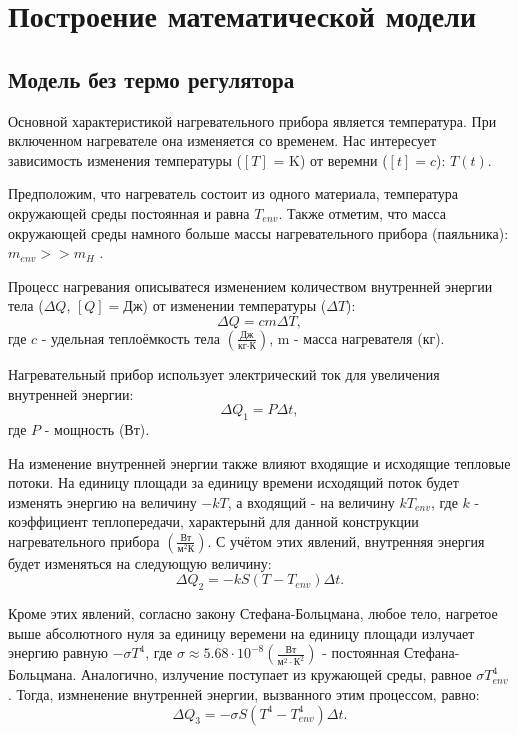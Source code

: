 \chapter{Построение математической модели}
\section{Модель без термо регулятора}
Основной характеристикой нагревательного прибора является температура. При включенном нагревателе она изменяется со временем. Нас интересует зависимость изменения температуры ($[T]$ = K) от веремни ($[t]=c$): $T(t)$.

Предположим, что нагреватель состоит из одного материала, температура окружающей среды постоянная и равна $T_{env}$. Также отметим, что масса окружающей среды намного больше массы нагревательного прибора (паяльника): $m_{env} >> m_H$ .

Процесс нагревания описыватеся \cite{quant} изменением количеством внутренней энергии тела ($\Delta Q$, $[Q]=\text{Дж}$)  от изменении температуры ($\Delta T$):
\begin{equation}
	\Delta Q = cm\Delta T,
	\label{eq:heat_energy}
\end{equation}
где $c$ - удельная теплоёмкость тела $\left(\frac{\text{Дж}}{\text{кг}\cdot\text{К}}\right)$, m - масса нагревателя (кг).

Нагревательный прибор использует электрический ток для увеличения внутренней энергии:
\begin{equation}
	\Delta Q_1 = P \Delta t,
	\label{eq:electrical_energy}
\end{equation}
где $P$ - мощность (Вт).

На изменение внутренней энергии также влияют входящие и исходящие тепловые потоки.
На единицу площади за единицу времени исходящий поток будет изменять энергию на величину $-kT$, 
а входящий - на величину $kT_{env}$, где $k$ - коэффициент теплопередачи, характерынй для данной конструкции нагревательного прибора $\left(\frac{\text{Вт}}{\text{м}^2\text{К}}\right)$. С учётом этих явлений, внутренняя энергия будет изменяться на следующую величину:
\begin{equation}
	\Delta Q_2 = -kS(T-T_{env})\Delta t.
	\label{eq:heat_transfer}
\end{equation}

Кроме этих явлений, согласно закону Стефана-Больцмана, любое тело, нагретое выше абсолютного нуля за единицу веремени на единицу площади излучает энергию равную $-\sigma T^4$, где $\sigma \approx 5.68 \cdot 10 ^{-8} \left(\frac{\text{Вт}}{\text{м}^2\cdot\text{К}^2}\right) $ - постоянная Стефана-Больцмана. Аналогично, излучение поступает из кружающей среды, равное $\sigma T^4_{env}$.
Тогда, измненение внутренней энергии, вызванного этим процессом, равно:
\begin{equation}
	\Delta Q_3 = -\sigma S (T^4 - T^4_{env}) \Delta t.
	\label{eq:stefan_boltzmann}
\end{equation}

